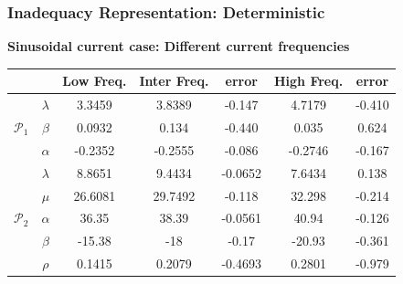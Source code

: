 \documentclass[10pt,xcolor=dvipsnames,compress]{beamer}
\begin{document}
\begin{frame}
\frametitle{Inadequacy Representation: Deterministic}

\textbf{Sinusoidal current case: Different current frequencies}


\vfill

\begin{table}
\centering
\begin{tabular}{cc|c|cc|cc}
\cline{3-7}
                                      &         & Low Freq. & Inter Freq. & error & High Freq. & error \\ \hline
\multicolumn{1}{c|}{} & $\lambda$ & 3.3459 & 3.8389 & -0.147 & 4.7179 & -0.410\\
\multicolumn{1}{c|}{$\mathcal{P}_1$} & $\beta$ & 0.0932 & 0.134 & -0.440 & 0.035 & 0.624 \\
\multicolumn{1}{c|}{}  & $\alpha$ & -0.2352 & -0.2555 & -0.086	& -0.2746	& -0.167 \\ \hline
\multicolumn{1}{c|}{} & $\lambda$ & 8.8651 &  9.4434  & -0.0652 &  7.6434 & 0.138 \\
\multicolumn{1}{c|}{}  &$\mu	$ & 26.6081 & 29.7492  & -0.118 & 32.298 & -0.214 \\
\multicolumn{1}{c|}{$\mathcal{P}_2$}  &$\alpha$ & 36.35 & 38.39 & -0.0561 & 40.94	& -0.126  \\
\multicolumn{1}{c|}{}  &$\beta$	& -15.38 &  -18	& -0.17 & -20.93 & -0.361  \\
\multicolumn{1}{c|}{}   &$\rho$	& 0.1415	& 0.2079	& -0.4693	& 0.2801	& -0.979  \\ \hline
\end{tabular}
\end{table}


\vfill
\end{frame}
\end{document}
